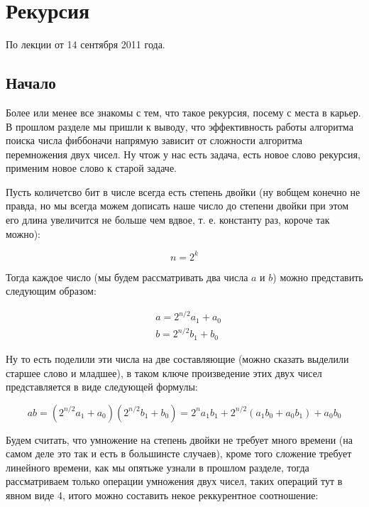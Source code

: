 \chapter{Рекурсия}

По лекции от 14 сентября 2011 года.

\section{Начало}

Более или менее все знакомы с тем, что такое рекурсия, посему с места в карьер. В прошлом разделе мы пришли к выводу, что эффективность работы алгоритма поиска числа фиббоначи напрямую зависит от сложности алгоритма перемножения двух чисел. Ну чтож у нас есть задача, есть новое слово рекурсия, применим новое слово к старой задаче.

Пусть количетсво бит в числе всегда есть степень двойки (ну вобщем конечно не правда, но мы всегда можем дописать наше число до степени двойки при этом его длина увеличится не больше чем вдвое, т. е.  константу раз, короче так можно):

\begin{equation}
	n = 2^k
\end{equation}

Тогда каждое число (мы будем рассматривать два числа $a$ и $b$) можно представить следующим образом:

\begin{equation}
	\begin{split}
		& a = 2^{n/2}a_1 + a_0 \\
		& b = 2^{n/2}b_1 + b_0
	\end{split}
\end{equation}

Ну то есть поделили эти числа на две составляющие (можно сказать выделили старшее слово и младшее), в таком ключе произведение этих двух чисел представляется в виде следующей формулы:

\begin{equation}
	ab = (2^{n/2}a_1 + a_0)(2^{n/2}b_1 + b_0) = 2^na_1b_1 + 2^{n/2}(a_1b_0+a_0b_1) + a_0b_0
\end{equation}

Будем считать, что умножение на степень двойки не требует много времени (на самом деле это так и есть в большинсте случаев), кроме того сложение требует линейного времени, как мы опятьже узнали в прошлом разделе, тогда рассматриваем только операции умножения двух чисел, таких операций тут в явном виде 4, итого можно составить некое реккурентное соотношение:

